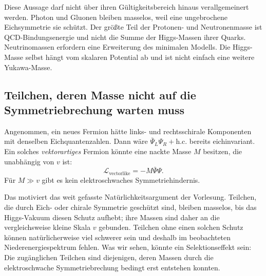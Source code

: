 Diese Aussage darf nicht über ihren Gültigkeitsbereich hinaus verallgemeinert werden. Photon und Gluonen bleiben masselos, weil eine ungebrochene Eichsymmetrie sie schützt. Der größte Teil der Protonen- und Neutronenmasse ist QCD-Bindungsenergie und nicht die Summe der Higgs-Massen ihrer Quarks. Neutrinomassen erfordern eine Erweiterung des minimalen Modells. Die Higgs-Masse selbst hängt vom skalaren Potential ab und ist nicht einfach eine weitere Yukawa-Masse.

\subsection{Teilchen, deren Masse nicht auf die Symmetriebrechung warten muss}

Angenommen, ein neues Fermion hätte links- und rechtsschirale Komponenten mit denselben Eichquantenzahlen. Dann wäre \(\bar\Psi_L\Psi_R+\mathrm{h.c.}\) bereits eichinvariant. Ein solches \emph{vektorartiges} Fermion könnte eine nackte Masse \(M\) besitzen, die unabhängig von \(v\) ist:
\begin{equation}
  \mathcal L_{\mathrm{vectorlike}}
  =-M\bar\Psi\Psi.
  \label{eq:l09-vectorlike-mass}
\end{equation}
Für \(M\gg v\) gibt es kein elektroschwaches Symmetriehindernis.

Das motiviert das weit gefasste Natürlichkeitsargument der Vorlesung. Teilchen, die durch Eich- oder chirale Symmetrie geschützt sind, bleiben masselos, bis das Higgs-Vakuum diesen Schutz aufhebt; ihre Massen sind daher an die vergleichsweise kleine Skala \(v\) gebunden. Teilchen ohne einen solchen Schutz können natürlicherweise viel schwerer sein und deshalb im beobachteten Niederenergiespektrum fehlen. Was wir sehen, könnte ein Selektionseffekt sein: Die zugänglichen Teilchen sind diejenigen, deren Massen durch die elektroschwache Symmetriebrechung bedingt erst entstehen konnten.

\begin{classroomqa}
\end{classroomqa}

